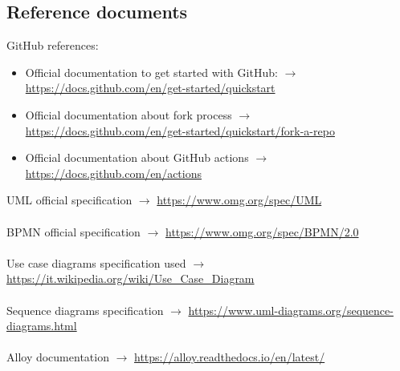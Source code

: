 \documentclass{article}
\begin{document}
{\begin{itemize}
\end{itemize}
\subsection{Reference documents}
GitHub references:
\begin{itemize}
    \item Official documentation to get started with GitHub: $\rightarrow$ \url{https://docs.github.com/en/get-started/quickstart}
    \item Official documentation about fork process $\rightarrow$ \url{https://docs.github.com/en/get-started/quickstart/fork-a-repo}
    \item Official documentation about GitHub actions $\rightarrow$ \url{https://docs.github.com/en/actions}
\end{itemize}
UML official specification $\rightarrow$ \url{https://www.omg.org/spec/UML}
\\ \\
BPMN official specification $\rightarrow$ \url{https://www.omg.org/spec/BPMN/2.0}
\\ \\
Use case diagrams specification used $\rightarrow$ \url{https://it.wikipedia.org/wiki/Use_Case_Diagram}
\\ \\
Sequence diagrams specification $\rightarrow$ \url{https://www.uml-diagrams.org/sequence-diagrams.html}
\\ \\
Alloy documentation $\rightarrow$ \url{https://alloy.readthedocs.io/en/latest/}

}
\end{document}
